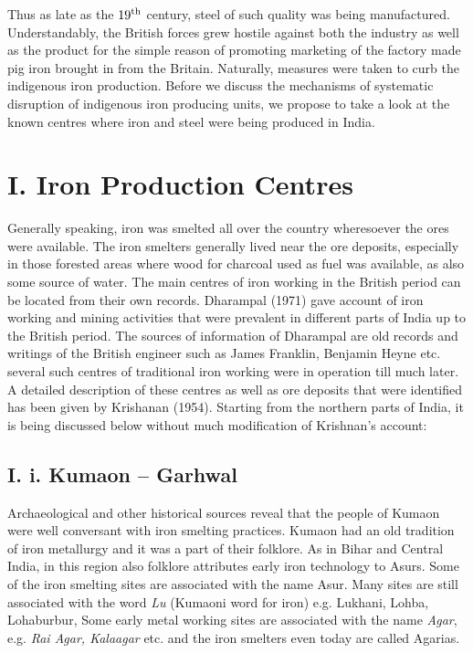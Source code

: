 Thus as late as the $19^{\rm th}$ century, steel of such quality was being manufactured. Understandably, the British forces grew hostile against both the industry as well as the product for the simple reason of promoting marketing of the factory made pig iron brought in from the Britain. Naturally, measures were taken to curb the indigenous iron production. Before we discuss the mechanisms of systematic disruption of indigenous iron producing units, we propose to take a look at the known centres where iron and steel were being produced in India. 

\section*{I. Iron Production Centres}\label{chapter6-section-1.1}

Generally speaking, iron was smelted all over the country wheresoever the ores were available.  The iron smelters generally lived near the ore deposits, especially in those forested areas where wood for charcoal used as fuel was available, as also some source of water. The main centres of iron working in the British period can be located from their own records. Dharampal (1971) gave account of iron working and mining activities that were prevalent in different parts of India up to the British period. The sources of information of Dharampal are old records and writings of the British engineer such as James Franklin, Benjamin Heyne etc. several such centres of traditional iron working were in operation till much later. A detailed description of these centres as well as ore deposits that were identified has been given by Krishanan (1954). Starting from the northern parts of India, it is being discussed below without much modification of Krishnan’s account:

\newpage

\subsection*{I. i. Kumaon – Garhwal}\label{subsection-1}

Archaeological and other historical sources reveal that the people of Kumaon were well conversant with iron smelting practices. Kumaon had an old tradition of iron metallurgy and it was a part of their folklore. As in Bihar and Central India, in this region also folklore attributes early iron technology to Asurs. Some of the iron smelting sites are associated with the name Asur. Many sites are still associated with the word {\it Lu} (Kumaoni word for iron) e.g. Lukhani, Lohba, Lohaburbur, Some early metal working sites are associated with the name {\it Agar}, e.g. {\it Rai Agar, Kalaagar} etc. and the iron smelters even today are called Agarias.

